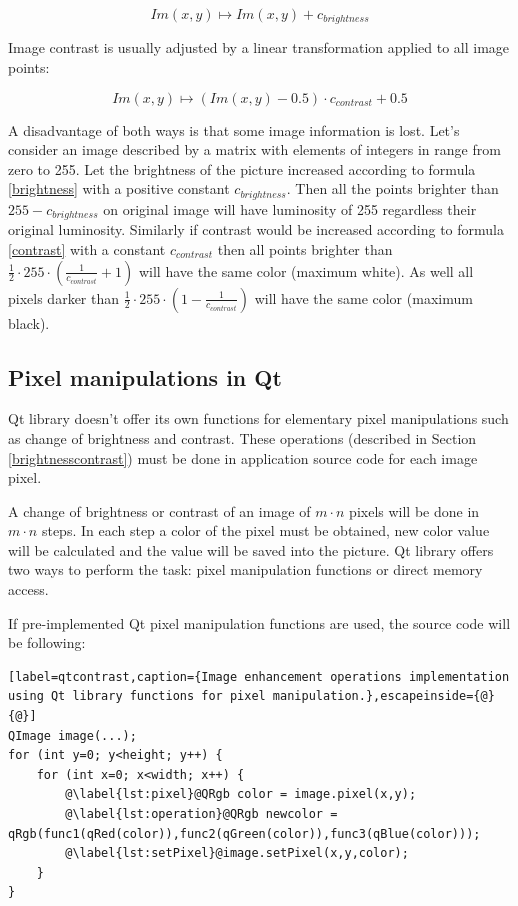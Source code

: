 \begin{equation}
\label{brightness}
  Im(x,y) \longmapsto Im(x,y) + c_{brightness} 
\end{equation}

Image contrast is usually adjusted by a linear transformation applied to all image points:

\begin{equation}
\label{contrast}
  Im(x,y) \longmapsto   (Im(x,y) - 0.5) \cdot c_{contrast} + 0.5
\end{equation}

A disadvantage of both ways is that some image information is lost. Let's consider an image described by a matrix with elements of integers in range from zero to 255. Let the brightness of the picture increased according to formula \eqref{brightness} with a positive constant $ c_{brightness} $. Then all the points brighter than $ 255 - c_{brightness} $ on original image will have luminosity of 255 regardless their original luminosity. Similarly if contrast would be increased according to formula \eqref{contrast} with a constant $ c_{contrast} $ then all points brighter than $ \frac{1}{2} \cdot 255 \cdot (\frac{1}{c_{contrast}}+1) $ will have the same color (maximum white). As well all pixels darker than $ \frac{1}{2} \cdot 255 \cdot (1 - \frac{1}{c_{contrast}}) $ will have the same color (maximum black).


\subsection{Pixel manipulations in Qt}

Qt library doesn't offer its own functions for elementary pixel manipulations such as change of brightness and contrast. These operations (described in Section \ref{brightnesscontrast}) must be done in application source code for each image pixel.

A change of brightness or contrast of an image of $m \cdot n$ pixels will be done in $m \cdot n$ steps. In each step a color of the pixel must be obtained, new color value will be calculated and the value will be saved into the picture. Qt library offers two ways to perform the task: pixel manipulation functions or direct memory access.

If pre-implemented Qt pixel manipulation functions are used, the source code will be following:

\begin{lstlisting}[label=qtcontrast,caption={Image enhancement operations implementation using Qt library functions for pixel manipulation.},escapeinside={@}{@}]
QImage image(...);
for (int y=0; y<height; y++) {
	for (int x=0; x<width; x++) {
		@\label{lst:pixel}@QRgb color = image.pixel(x,y);
		@\label{lst:operation}@QRgb newcolor = qRgb(func1(qRed(color)),func2(qGreen(color)),func3(qBlue(color)));
		@\label{lst:setPixel}@image.setPixel(x,y,color);
	}
}
\end{lstlisting}

